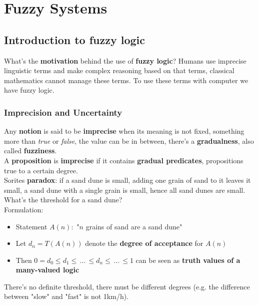 \documentclass[11pt]{article}
\begin{document}
		\newpage
		
		
		
		\section{Fuzzy Systems}
		
		\subsection{Introduction to fuzzy logic}
		
		What's the \textbf{motivation} behind the use of \textbf{fuzzy logic}? Humans use imprecise linguistic terms and make complex reasoning based on that terms, classical mathematics cannot manage these terms. To use these terms with computer we have fuzzy logic.\\
		
		\subsubsection{Imprecision and Uncertainty}
		
		Any \textbf{notion} is said to be \textbf{imprecise} when its meaning is not fixed, something more than \textit{true} or \textit{false}, the value can be in between, there's a \textbf{gradualness}, also called \textbf{fuzziness}.\\
		
		A \textbf{proposition} is \textbf{imprecise} if it contains \textbf{gradual predicates}, propositions true to a certain degree.\\
		
		Sorites \textbf{paradox}: if a sand dune is small, adding one grain of sand to it leaves it small, a sand dune with a single grain is small, hence all sand dunes are small. What's the threshold for a sand dune?\\
		Formulation:
		\begin{itemize}
			\item Statement $A(n):$ "$n$ grains of sand are a sand dune"
			\item Let $d_n = T(A(n))$ denote the \textbf{degree of acceptance} for $A(n)$
			\item Then $0 = d_0 \leq d_1 \leq \, \dots \, \leq d_n \leq \, \dots \, \leq 1$ can be seen as \textbf{truth values of a many-valued logic} 
		\end{itemize}
		There's no definite threshold, there must be different degrees (e.g. the difference between "slow" and "fast" is not 1km/h).\\
		
\end{document}
